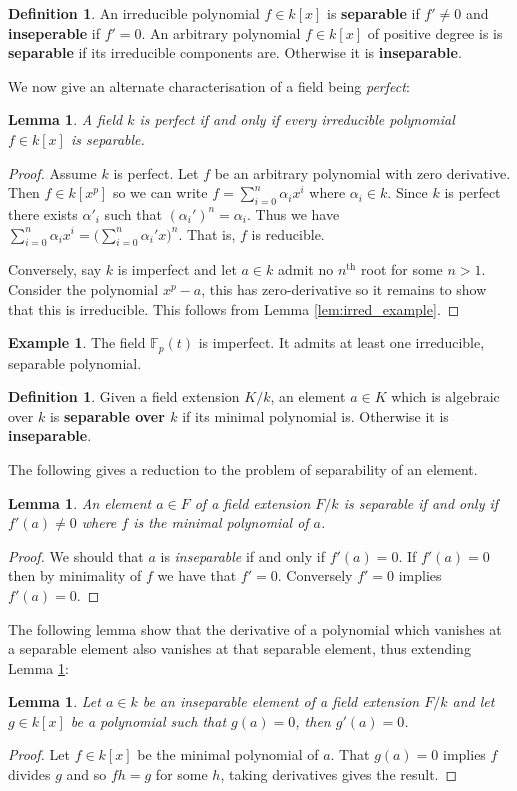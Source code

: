 \documentclass[12pt]{article}
\theoremstyle{plain}
\newtheorem{lemma}[thm]{Lemma}
\theoremstyle{definition}
\newtheorem{defn}[thm]{Definition} %
\newtheorem{example}[thm]{Example}
\newcommand{\bb}[1]{\mathbb{#1}}
\begin{document}
\begin{defn}\label{def:separable_irred_poly}
An irreducible polynomial $f \in k[x]$ is \textbf{separable} if $f' \neq 0$ and \textbf{inseperable} if $f' = 0$. An arbitrary polynomial $f \in k[x]$ of positive degree is is \textbf{separable} if its irreducible components are. Otherwise it is \textbf{inseparable}. 
\end{defn}
We now give an alternate characterisation of a field being \emph{perfect}:
\begin{lemma}
\label{lem:perf_alt_defn}
A field $k$ is perfect if and only if every irreducible polynomial $f \in k[x]$ is separable.
\end{lemma}
\begin{proof}
Assume $k$ is perfect. Let $f$ be an arbitrary polynomial with zero derivative. Then $f \in k[x^p]$ so we can write $f = \sum_{i = 0}^n \alpha_i x^i$ where $\alpha_i \in k$. Since $k$ is perfect there exists $\alpha'_i$ such that $(\alpha_i')^n = \alpha_i$. Thus we have $\sum_{i = 0}^n \alpha_i x^i = \big(\sum_{i = 0}^n \alpha_i' x\big)^n$. That is, $f$ is reducible.

Conversely, say $k$ is imperfect and let $a \in k$ admit no $n^\text{th}$ root for some $n > 1$. Consider the polynomial $x^p - a$, this has zero-derivative so it remains to show that this is irreducible. This follows from Lemma \ref{lem:irred_example}.
\end{proof}
\begin{example}
\label{ex:imperfect} The field $\bb{F}_p(t)$ is imperfect. It admits at least one irreducible, separable polynomial.
\end{example}
%
\begin{defn}\label{def:separable_element}
Given a field extension $K/k$, an element $a \in K$ which is algebraic over $k$ is \textbf{separable over $k$} if its minimal polynomial is. Otherwise it is \textbf{inseparable}.
\end{defn}
The following gives a reduction to the problem of separability of an element.
\begin{lemma}
\label{lem:sep_elt_alt_def}
An element $a \in F$ of a field extension $F/k$ is separable if and only if $f'(a) \neq 0$ where $f$ is the minimal polynomial of $a$.
\end{lemma}
\begin{proof}
We should that $a$ is \emph{inseparable} if and only if $f'(a) = 0$. If $f'(a) = 0$ then by minimality of $f$ we have that $f' = 0$. Conversely $f' = 0$ implies $f'(a) = 0$.
\end{proof}
%
The following lemma show that the derivative of a polynomial which vanishes at a separable element also vanishes at that separable element, thus extending Lemma \ref{lem:sep_elt_alt_def}:
\begin{lemma}
\label{lem:seemingly_useless}
Let $a \in k$ be an inseparable element of a field extension $F/k$ and let $g \in k[x]$ be a polynomial such that $g(a) = 0$, then $g'(a) = 0$.
\end{lemma}
\begin{proof}
Let $f \in k[x]$ be the minimal polynomial of $a$. That $g(a) = 0$ implies $f$ divides $g$ and so $fh = g$ for some $h$, taking derivatives gives the result.
\end{proof}
\end{document}
